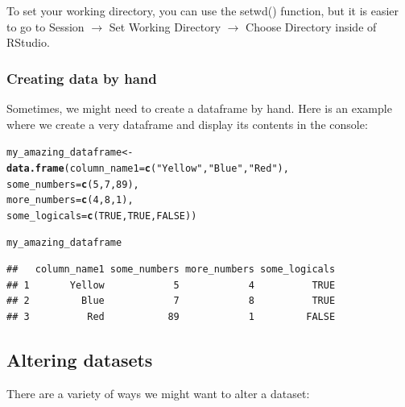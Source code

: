 \documentclass{article}\usepackage[]{graphicx}\usepackage[]{color}
\makeatletter
\newcommand{\hlnum}[1]{\textcolor[rgb]{0.686,0.059,0.569}{#1}}%
\newcommand{\hlstr}[1]{\textcolor[rgb]{0.192,0.494,0.8}{#1}}%
\newcommand{\hlstd}[1]{\textcolor[rgb]{0.345,0.345,0.345}{#1}}%
\newcommand{\hlkwb}[1]{\textcolor[rgb]{0.69,0.353,0.396}{#1}}%
\newcommand{\hlkwc}[1]{\textcolor[rgb]{0.333,0.667,0.333}{#1}}%
\newcommand{\hlkwd}[1]{\textcolor[rgb]{0.737,0.353,0.396}{\textbf{#1}}}%
\newenvironment{kframe}{%
 \def\at@end@of@kframe{}%
 \ifinner\ifhmode%
  \def\at@end@of@kframe{\end{minipage}}%
  \begin{minipage}{\columnwidth}%
 \fi\fi%
 \def\FrameCommand##1{\hskip\@totalleftmargin \hskip-\fboxsep
 \colorbox{shadecolor}{##1}\hskip-\fboxsep
     \hskip-\linewidth \hskip-\@totalleftmargin \hskip\columnwidth}%
 \MakeFramed {\advance\hsize-\width
   \@totalleftmargin\z@ \linewidth\hsize
   \@setminipage}}%
 {\par\unskip\endMakeFramed%
 \at@end@of@kframe}
\newenvironment{knitrout}{}{} %
\makeatother
\begin{document}
To set your working directory, you can use the setwd() function, but it is easier to go to Session $\rightarrow$ Set Working Directory $\rightarrow$ Choose Directory inside of RStudio.

\subsubsection{Creating data by hand}

Sometimes, we might need to create a dataframe by hand. Here is an example where we create a very dataframe and display its contents in the console:

\begin{knitrout}
\color{fgcolor}\begin{kframe}
\begin{alltt}
\hlstd{my_amazing_dataframe} \hlkwb{<-} \hlkwd{data.frame}\hlstd{(}\hlkwc{column_name1} \hlstd{=} \hlkwd{c}\hlstd{(}\hlstr{"Yellow"}\hlstd{,} \hlstr{"Blue"}\hlstd{,} \hlstr{"Red"}\hlstd{),}
                                   \hlkwc{some_numbers} \hlstd{=} \hlkwd{c}\hlstd{(}\hlnum{5}\hlstd{,} \hlnum{7}\hlstd{,} \hlnum{89}\hlstd{),}
                                   \hlkwc{more_numbers} \hlstd{=} \hlkwd{c}\hlstd{(}\hlnum{4}\hlstd{,} \hlnum{8}\hlstd{,} \hlnum{1}\hlstd{),}
                                   \hlkwc{some_logicals} \hlstd{=} \hlkwd{c}\hlstd{(}\hlnum{TRUE}\hlstd{,} \hlnum{TRUE}\hlstd{,} \hlnum{FALSE}\hlstd{))}

\hlstd{my_amazing_dataframe}
\end{alltt}
\begin{verbatim}
##   column_name1 some_numbers more_numbers some_logicals
## 1       Yellow            5            4          TRUE
## 2         Blue            7            8          TRUE
## 3          Red           89            1         FALSE
\end{verbatim}
\end{kframe}
\end{knitrout}


\subsection{Altering datasets}

There are a variety of ways we might want to alter a dataset:
\end{document}
